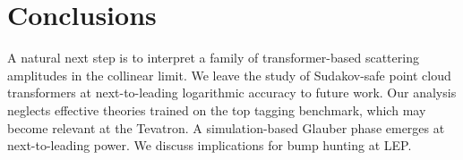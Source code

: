 \section{Conclusions}\label{sec:conclusions}

A natural next step is to interpret a family of transformer-based
scattering amplitudes in the collinear limit. We leave the study of
Sudakov-safe point cloud transformers at next-to-leading logarithmic
accuracy to future work. Our analysis neglects effective theories
trained on the top tagging benchmark, which may become relevant at the
Tevatron. A simulation-based Glauber phase emerges at next-to-leading
power. We discuss implications for bump hunting at LEP.

